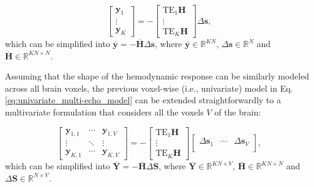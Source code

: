 \begin{equation}
    \left[\begin{array}{c} \mathbf{y}_{1} \\
        \vdots \\
        \mathbf{y}_{K}
    \end{array}\right]
    =
    -\left[\begin{array}{c} \mathrm{TE}_{1} \mathbf{H} \\
        \vdots \\
        \mathrm{TE}_{K} \mathbf{H}
    \end{array}\right]
    \Delta \mathbf{s},
\label{eq:univariate_multi-echo_model}
\end{equation}
which can be simplified into $\bar{\mathbf{y}}=-\overline{\mathbf{H}} \Delta
\mathbf{s}$, where $\bar{\mathbf{y}} \in \mathbb{R}^{KN}$, $\Delta \mathbf{s}
\in \mathbb{R}^{N}$ and $\overline{\mathbf{H}} \in \mathbb{R}^{KN \times N}$. 

Assuming that the shape of the hemodynamic response can be similarly modeled
across all brain voxels, the previous voxel-wise (i.e., univariate) model in
Eq.\eqref{eq:univariate_multi-echo_model} can be extended straightforwardly to a
multivariate formulation that considers all the voxels $V$ of the brain:

\begin{equation}
    \begin{bmatrix}
        \mathbf{y}_{1,1} & \cdots & \mathbf{y}_{1,V} \\
        \vdots & \ddots & \vdots \\
        \mathbf{y}_{K,1} & \cdots & \mathbf{y}_{K,V}
    \end{bmatrix}
    =
    -
    \begin{bmatrix}
        \mathrm{TE}_{1} \mathbf{H} \\
        \vdots \\
        \mathrm{TE}_{K} \mathbf{H}
    \end{bmatrix}
    \begin{bmatrix}
        \Delta \mathbf{s}_1 & \cdots & \Delta \mathbf{s}_V \\
    \end{bmatrix},
\label{eq:multivariate_multi-echo_model}
\end{equation}
which can be simplified into $\bar{\mathbf{Y}} = - \bar{\mathbf{H}} \Delta
\mathbf{S}$, where $\bar{\mathbf{Y}} \in \mathbb{R}^{KN \times V}$,
$\bar{\mathbf{H}} \in \mathbb{R}^{KN \times N}$ and $\Delta\mathbf{S} \in
\mathbb{R}^{N \times V}$.

